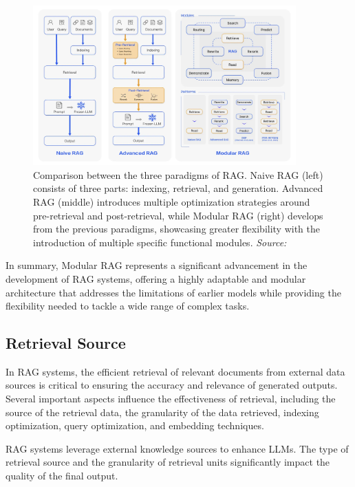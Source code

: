 \begin{figure}[h]
    \centering
    \includegraphics[width=0.9\textwidth]{images/llms/naive-adv-modular-rag.png}
    \caption{Comparison between the three paradigms of RAG. Naive RAG (left) consists of three parts: indexing, retrieval, and generation. Advanced RAG (middle) introduces multiple optimization strategies around pre-retrieval and post-retrieval, while Modular RAG (right) develops from the previous paradigms, showcasing greater flexibility with the introduction of multiple specific functional modules. \textit{Source:} \cite{gao2023retrieval}}
    \label{fig:rag_paradigms}
\end{figure}

In summary, Modular RAG represents a significant advancement in the development of RAG systems, offering a highly adaptable and modular architecture that addresses the limitations of earlier models while providing the flexibility needed to tackle a wide range of complex tasks.

\subsection{Retrieval Source}

In RAG systems, the efficient retrieval of relevant documents from external data sources is critical to ensuring the accuracy and relevance of generated outputs. Several important aspects influence the effectiveness of retrieval, including the source of the retrieval data, the granularity of the data retrieved, indexing optimization, query optimization, and embedding techniques.

RAG systems leverage external knowledge sources to enhance LLMs. The type of retrieval source and the granularity of retrieval units significantly impact the quality of the final output.

